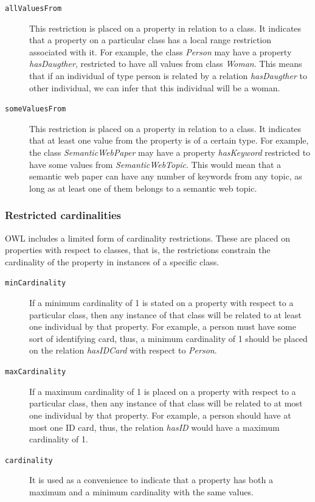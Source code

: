 \begin{description}
\item[\texttt{allValuesFrom}] This restriction is placed on a property in relation to a class. It indicates that a property on a particular class has a local range restriction associated with it. For example, the class \textit{Person} may have a property \textit{hasDaugther}, restricted to have all values from class \textit{Woman}. This means that if an individual of type person is related by a relation \textit{hasDaugther} to other individual, we can infer that this individual will be a woman.

\item[\texttt{someValuesFrom}] This restriction is placed on a property in relation to a class. It indicates that at least one value from the property is of a certain type. For example, the class \textit{SemanticWebPaper} may have a property \textit{hasKeyword} restricted to have some values from \textit{SemanticWebTopic}. This would mean that a semantic web paper can have any number of keywords from any topic, as long as at least one of them belongs to a semantic web topic.
\end{description}

\subsubsection*{Restricted cardinalities}

OWL includes a limited form of cardinality restrictions. These are placed on properties with respect to classes, that is, the restrictions constrain the cardinality of the property in instances of a specific class.

\begin{description}
\item[\texttt{minCardinality}] If a minimum cardinality of 1 is stated on a property with respect to a particular class, then any instance of that class will be related to at least one individual by that property. For example, a person must have some sort of identifying card, thus, a minimum cardinality of 1 should be placed on the relation \textit{hasIDCard} with respect to \textit{Person}.

\item[\texttt{maxCardinality}] If a maximum cardinality of 1 is placed on a property with respect to a particular class, then any instance of that class will be related to at most one individual by that property. For example, a person should have at most one ID card, thus, the relation \textit{hasID} would have a maximum cardinality of 1.

\item[\texttt{cardinality}] It is used as a convenience to indicate that a property has both a maximum and a minimum cardinality with the same values. 
\end{description}


